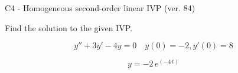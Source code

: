 \begin{exercise}
  \begin{exerciseTitle}C4 - Homogeneous second-order linear IVP (ver. 84)\end{exerciseTitle}
  \begin{exerciseStatement}
    
Find the solution to the given IVP.

    
\[y''+3y'-4y = 0 \hspace{1em} y(0) = -2 , y'(0) = 8\]

  \end{exerciseStatement}
  \begin{exerciseAnswer}
    
\[y= -2 \, e^{\left(-4 \, t\right)}\]

  \end{exerciseAnswer}
\end{exercise}